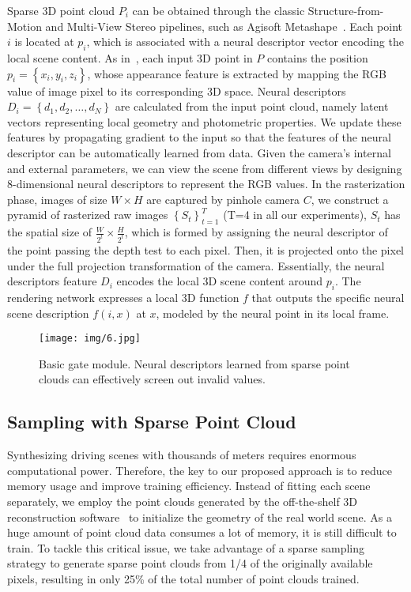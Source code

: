 \documentclass[sigconf]{acmart}
\begin{document}
Sparse 3D point cloud $P_{i}$ can be obtained through the classic Structure-from-Motion and Multi-View Stereo pipelines, such as Agisoft Metashape~\cite{Metashape}. Each point $i$ is located at $p_{i}$, which is associated with a neural descriptor vector encoding the local scene content. As in~\cite{aliev2020neural}, each input 3D point in $P$ contains the position $p_{i}=\left\{x_{i}, y_{i}, z_{i}\right\}$, whose appearance feature is extracted by mapping the RGB value of image pixel to its corresponding 3D space. Neural descriptors $D_{i}=\left\{d_{1}, d_{2}, \ldots, d_{N}\right\}$ are calculated from the input point cloud, namely latent vectors representing local geometry and photometric properties. We update these features by propagating gradient to the input so that the features of the neural descriptor can be automatically learned from data. Given the camera's internal and external parameters, we can view the scene from different views by designing 8-dimensional neural descriptors to represent the RGB values. In the rasterization phase, images of size $W \times H$ are captured by pinhole camera $C$, we construct a pyramid of rasterized raw images $\left\{S_{t}\right\}_{t=1}^{T}$ (T=4 in all our experiments), $S_{t}$ has the spatial size of $\frac{W}{2^{t}} \times \frac{H}{2^{t}}$, which is formed by assigning the neural descriptor of the point passing the depth test to each pixel. Then, it is projected onto the pixel under the full projection transformation of the camera. Essentially, the neural descriptors feature $D_{i}$ encodes the local 3D scene content around $p_{i}$. The rendering network expresses a local 3D function $f$ that outputs the specific neural scene description $f(i, x)$ at $x$, modeled by the neural point in its local frame.

 \begin{figure}[h]
  \centering
  \texttt{[image: img/6.jpg]}
  \caption{Basic gate module. Neural descriptors learned from sparse point clouds can effectively screen out invalid values.}
  \label{fig:label3}
\end{figure}


 
 

\subsection{Sampling with Sparse Point Cloud}
Synthesizing driving scenes with thousands of meters requires enormous computational power. Therefore, the key to our proposed approach is to reduce memory usage and improve training efficiency. Instead of fitting each scene separately, we employ the point clouds generated by the off-the-shelf 3D reconstruction software~\cite{Metashape} to initialize the geometry of the real world scene. As a huge amount of point cloud data consumes a lot of memory, it is still difficult to train. To tackle this critical issue, we take advantage of a sparse sampling strategy to generate sparse point clouds from 1/4 of the originally available pixels, resulting in only 25\% of the total number of point clouds trained.  
\end{document}
